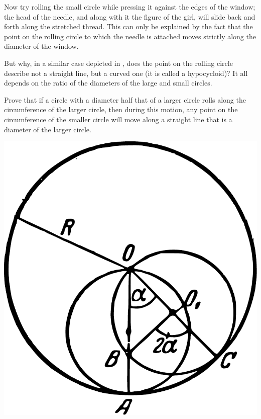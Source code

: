 Now try rolling the small circle while pressing it against the edges of the window; the head of the needle, and along with it the figure of the girl, will slide back and forth along the stretched thread. This can only be explained by the fact that the point on the rolling circle to which the needle is attached moves strictly along the diameter of the window.

But why, in a similar case depicted in , does the point on the rolling circle describe not a straight line, but a curved one (it is called a hypocycloid)? It all depends on the ratio of the diameters of the large and small circles. 



\ques Prove that if a circle with a diameter half that of a larger circle rolls along the circumference of the larger circle, then during this motion, any point on the circumference of the smaller circle will move along a straight line that is a diameter of the larger circle.

\begin{marginfigure}%
\centering
\includegraphics[width=\textwidth]{figures/ch-09/fig-133.pdf}
\end{marginfigure}

